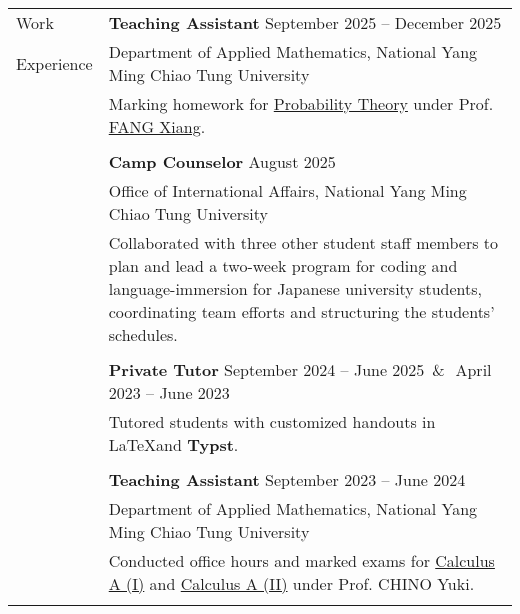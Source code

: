 \documentclass[letterpaper, 11pt]{article}
\newcommand{\spaceand}{\,\&\ \,}
\DeclareRobustCommand{\Typst}{\textcolor{TypstColor}{\TypstBuenard\textbf{Typst}}}
\begin{document}
\begin{center}
\begin{longtable}{p{0.76in}p{5.93in}}

        {\textcolor{OliveGreen}{Work}} & \textbf{Teaching Assistant}  \hfill September 2025 -- December 2025 \\
        {\textcolor{OliveGreen}{Experience}} & Department of Applied Mathematics, National Yang Ming Chiao Tung University\\
        & Marking homework for \href{https://reurl.cc/qYaYr3}{Probability Theory} under Prof. \href{https://www.math.nycu.edu.tw/faculty/e_faculty_content.php?S_ID=149&SC_ID=1}{FANG Xiang}.\\
        & \\

        & \textbf{Camp Counselor} \hfill August 2025 \\
        & Office of International Affairs, National Yang Ming Chiao Tung University \\
        & Collaborated with three other student staff members to plan and lead a two-week program for coding and language-immersion for Japanese university students, coordinating team efforts and structuring the students' schedules.\\
        & \\

        & \textbf{Private Tutor} \hfill September 2024 -- June 2025 \spaceand April 2023 -- June 2023 \\
        & Tutored students with customized handouts in \LaTeX and \Typst. \\
        & \\
        

        & \textbf{Teaching Assistant}  \hfill September 2023 -- June 2024 \\
        & Department of Applied Mathematics, National Yang Ming Chiao Tung University\\
        & Conducted office hours and marked exams for \href{https://reurl.cc/Djp5jN}{Calculus A (I)} and \href{https://reurl.cc/RqoMez}{Calculus A (II)} under Prof. CHINO Yuki.\\
        & \\


\end{longtable}
\end{center}
\end{document}
